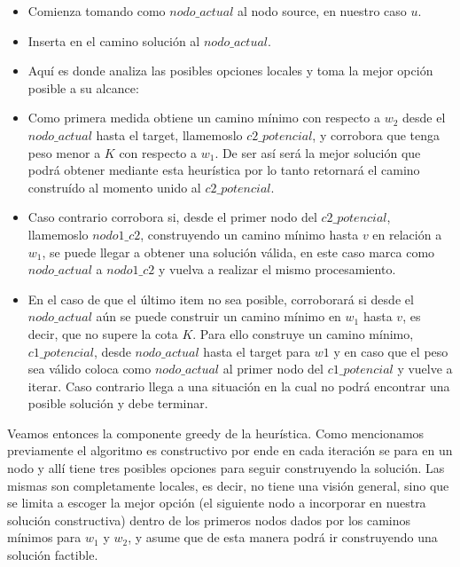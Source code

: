 \begin{itemize}
\item Comienza tomando como $nodo\_actual$ al nodo source, en nuestro caso $u$.
\item Inserta en el camino soluci\'on al $nodo\_actual$.
\item Aqu\'i es donde analiza las posibles opciones locales y toma la mejor opci\'on posible a su alcance:
\item Como primera medida obtiene un camino m\'inimo con respecto a $w_2$ desde el $nodo\_actual$ hasta el target, llamemoslo $c2\_{potencial}$, y corrobora que tenga peso menor a $K$ con respecto a $w_1$. De ser as\'i ser\'a la mejor soluci\'on que podr\'a obtener mediante esta heur\'istica por lo tanto retornar\'a el camino constru\'ido al momento unido al $c2\_{potencial}$.
\item Caso contrario corrobora si, desde el primer nodo del $c2\_{potencial}$, llamemoslo $nodo1\_c2$, construyendo un camino m\'inimo hasta $v$ en relaci\'on a $w_1$, se puede llegar a obtener una soluci\'on v\'alida, en este caso marca como $nodo\_actual$ a $nodo1\_c2$ y vuelva a realizar el mismo procesamiento.
\item En el caso de que el \'ultimo item no sea posible, corroborar\'a si desde el $nodo\_actual$ a\'un se puede construir un camino m\'inimo en $w_1$ hasta $v$, es decir, que no supere la cota $K$. Para ello construye un camino m\'inimo, $c1\_{potencial}$, desde $nodo\_actual$ hasta el target para $w1$ y en caso que el peso sea v\'alido coloca como $nodo\_actual$ al primer nodo del $c1\_{potencial}$ y vuelve a iterar. Caso contrario llega a una situaci\'on en la cual no podr\'a encontrar una posible soluci\'on y debe terminar.
\end{itemize}

Veamos entonces la componente greedy de la heur\'istica. Como mencionamos previamente el algoritmo es constructivo por ende en cada iteraci\'on se para en un nodo y all\'i tiene tres posibles opciones para seguir construyendo la soluci\'on. Las mismas son completamente locales, es decir, no tiene una visi\'on general, sino que se limita a escoger la mejor opci\'on (el siguiente nodo a incorporar en nuestra soluci\'on constructiva) dentro de los primeros nodos dados por los caminos m\'inimos para $w_1$ y $w_2$, y asume que de esta manera podr\'a ir construyendo una soluci\'on factible.


